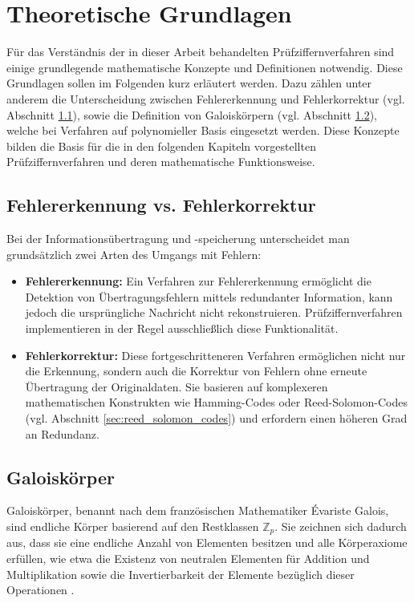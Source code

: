 
\chapter{Theoretische Grundlagen} \label{chap:theoretische_grundlagen}

Für das Verständnis der in dieser Arbeit behandelten Prüfziffernverfahren sind einige grundlegende mathematische Konzepte und Definitionen notwendig. Diese Grundlagen sollen im Folgenden kurz erläutert werden. Dazu zählen unter anderem die Unterscheidung zwischen Fehlererkennung und Fehlerkorrektur (vgl. Abschnitt \ref{sec:fehlererkennung_vs_fehlerkorrektur}), sowie die Definition von Galoiskörpern (vgl. Abschnitt \ref{sec:galois_fields}), welche bei Verfahren auf polynomieller Basis eingesetzt werden. Diese Konzepte bilden die Basis für die in den folgenden Kapiteln vorgestellten Prüfziffernverfahren und deren mathematische Funktionsweise.


\section{Fehlererkennung vs. Fehlerkorrektur} \label{sec:fehlererkennung_vs_fehlerkorrektur}
Bei der Informationsübertragung und -speicherung unterscheidet man grundsätzlich zwei Arten des Umgangs mit Fehlern:

\begin{itemize}
    \item \textbf{Fehlererkennung:} Ein Verfahren zur Fehlererkennung ermöglicht die Detektion von Übertragungsfehlern mittels redundanter Information, kann jedoch die ursprüngliche Nachricht nicht rekonstruieren. Prüfziffernverfahren implementieren in der Regel ausschließlich diese Funktionalität.

    \item \textbf{Fehlerkorrektur:} Diese fortgeschritteneren Verfahren ermöglichen nicht nur die Erkennung, sondern auch die Korrektur von Fehlern ohne erneute Übertragung der Originaldaten. Sie basieren auf komplexeren mathematischen Konstrukten wie Hamming-Codes oder Reed-Solomon-Codes (vgl. Abschnitt \ref{sec:reed_solomon_codes}) und erfordern einen höheren Grad an Redundanz.
\end{itemize}


\section{Galoiskörper} \label{sec:galois_fields}
Galoiskörper, benannt nach dem französischen Mathematiker Évariste Galois, sind endliche Körper basierend auf den Restklassen \(\mathbb{Z}_p\). Sie zeichnen sich dadurch aus, dass sie eine endliche Anzahl von Elementen besitzen und alle Körperaxiome erfüllen, wie etwa die Existenz von neutralen Elementen für Addition und Multiplikation sowie die Invertierbarkeit der Elemente bezüglich dieser Operationen \cite{Springer_RS}.

